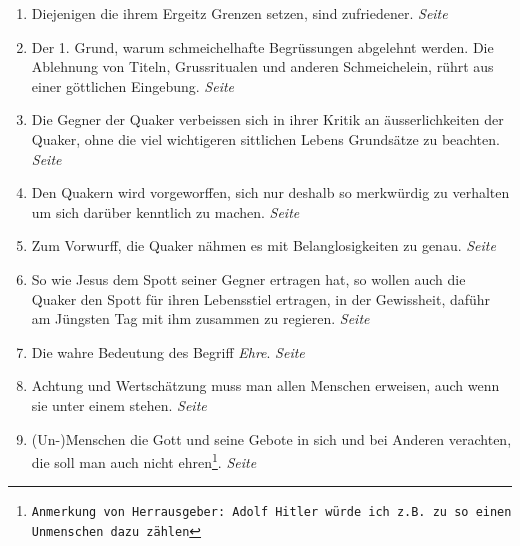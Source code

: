 \begin{enumerate}
 \item Diejenigen die ihrem Ergeitz Grenzen setzen, sind zufriedener.
 \dotfill \textit{Seite \pageref{ref:08_09_friedem}}\\
 
 \item Der 1. Grund, warum schmeichelhafte Begrüssungen abgelehnt werden. Die
Ablehnung von Titeln, Grussritualen und anderen Schmeichelein, rührt aus einer
göttlichen Eingebung.
 \dotfill \textit{Seite \pageref{ref:09_05_offenbarung}}\\
 
 \item Die Gegner der Quaker verbeissen sich in ihrer Kritik an äusserlichkeiten
der Quaker, ohne die viel wichtigeren sittlichen Lebens Grundsätze zu beachten. 
 \dotfill \textit{Seite \pageref{ref:09_06_grundsaetze}}\\
 
 \item Den Quakern wird vorgeworffen, sich nur deshalb so merkwürdig zu
verhalten um sich darüber kenntlich zu machen. 
 \dotfill \textit{Seite \pageref{ref:09_07_vorwurff}}\\
 
 \item Zum Vorwurff, die Quaker nähmen es mit Belanglosigkeiten zu genau.
 \dotfill \textit{Seite \pageref{ref:09_08_vorwurff}}\\
 
 \item So wie Jesus dem Spott seiner Gegner ertragen hat, so wollen auch die
Quaker den Spott für ihren Lebensstiel ertragen, in der Gewissheit, daführ am
Jüngsten Tag mit ihm zusammen zu regieren.
 \dotfill \textit{Seite \pageref{ref:09_10_spott}}\\
 
 \item Die wahre Bedeutung des Begriff \textit{Ehre}.
 \dotfill \textit{Seite \pageref{ref:09_12_ehre}}\\
 
 \item Achtung und Wertschätzung muss man allen Menschen erweisen, auch wenn sie
unter einem stehen.
 \dotfill \textit{Seite \pageref{ref:09_18_ehre}}\\
 
 \item (Un-)Menschen die Gott und seine Gebote in sich und bei Anderen
verachten, die soll man auch nicht ehren\footnote{\texttt{Anmerkung von
Herrausgeber: Adolf Hitler würde ich z.B. zu so einen Unmenschen dazu zählen}}.
 \dotfill \textit{Seite \pageref{ref:09_19_ehre}}\\
 

\end{enumerate}
